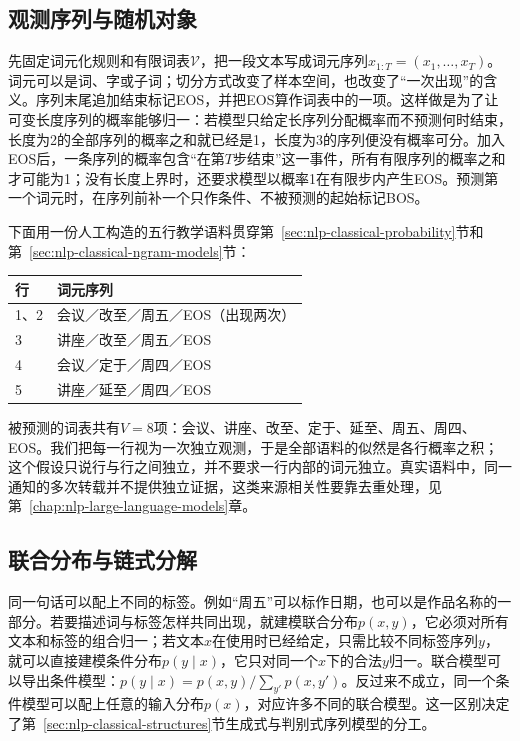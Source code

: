 \subsection{观测序列与随机对象}
\label{sec:nlp-classical-objects}

先固定词元化规则和有限词表$\mathcal V$，把一段文本写成词元序列$x_{1:T}=(x_1,\ldots,x_T)$。词元可以是词、字或子词；切分方式改变了样本空间，也改变了“一次出现”的含义。序列末尾追加结束标记EOS，并把EOS算作词表中的一项。这样做是为了让可变长度序列的概率能够归一：若模型只给定长序列分配概率而不预测何时结束，长度为2的全部序列的概率之和就已经是1，长度为3的序列便没有概率可分。加入EOS后，一条序列的概率包含“在第$T$步结束”这一事件，所有有限序列的概率之和才可能为1；没有长度上界时，还要求模型以概率1在有限步内产生EOS。预测第一个词元时，在序列前补一个只作条件、不被预测的起始标记BOS。

下面用一份人工构造的五行教学语料贯穿第~\ref{sec:nlp-classical-probability}节和第~\ref{sec:nlp-classical-ngram-models}节：
\begin{center}
\begin{tabular}{@{}ll@{}}
\toprule
行 & 词元序列\\
\midrule
1、2 & 会议／改至／周五／EOS（出现两次）\\
3 & 讲座／改至／周五／EOS\\
4 & 会议／定于／周四／EOS\\
5 & 讲座／延至／周四／EOS\\
\bottomrule
\end{tabular}
\end{center}
被预测的词表共有$V=8$项：会议、讲座、改至、定于、延至、周五、周四、EOS。我们把每一行视为一次独立观测，于是全部语料的似然是各行概率之积；这个假设只说行与行之间独立，并不要求一行内部的词元独立。真实语料中，同一通知的多次转载并不提供独立证据，这类来源相关性要靠去重处理，见第~\ref{chap:nlp-large-language-models}章。

\subsection{联合分布与链式分解}
\label{sec:nlp-classical-joint-conditional}

同一句话可以配上不同的标签。例如“周五”可以标作日期，也可以是作品名称的一部分。若要描述词与标签怎样共同出现，就建模联合分布$p(x,y)$，它必须对所有文本和标签的组合归一；若文本$x$在使用时已经给定，只需比较不同标签序列$y$，就可以直接建模条件分布$p(y\mid x)$，它只对同一个$x$下的合法$y$归一。联合模型可以导出条件模型：$p(y\mid x)=p(x,y)/\sum_{y'}p(x,y')$。反过来不成立，同一个条件模型可以配上任意的输入分布$p(x)$，对应许多不同的联合模型。这一区别决定了第~\ref{sec:nlp-classical-structures}节生成式与判别式序列模型的分工。

